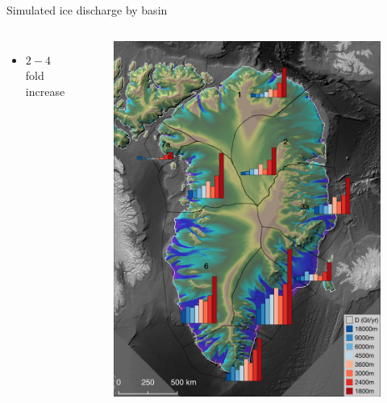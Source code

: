 \documentclass[shownotes notes,intlimits]{beamer}
\begin{document}
\begin{frame}{Simulated ice discharge by basin}
  \begin{columns}
    \column[T]{4cm}
    \begin{itemize}
      \item $2-4$ fold increase
    \end{itemize}
    \column[T]{6cm}
    \vspace{-1em}
    \begin{figure}
      \includegraphics[height=0.85\textheight]{lgm_cc_d_hist}
    \end{figure}
  \end{columns}
\end{frame}
\end{document}

